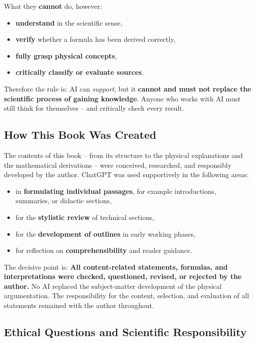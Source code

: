 What they \textbf{cannot} do, however:

\begin{itemize}
	\item \textbf{understand} in the scientific sense,
	\item \textbf{verify} whether a formula has been derived correctly,
	\item \textbf{fully grasp physical concepts},
	\item \textbf{critically classify or evaluate sources}.
\end{itemize}

Therefore the rule is:
AI can \emph{support}, but it \textbf{cannot and must not replace the scientific process of gaining knowledge}.
Anyone who works with AI must still think for themselves --
and critically check every result.

\subsection*{How This Book Was Created}

The contents of this book --
from its structure to the physical explanations
and the mathematical derivations --
were conceived, researched, and responsibly developed by the author.
ChatGPT was used supportively in the following areas:

\begin{itemize}
	\item in \textbf{formulating individual passages},
	for example introductions, summaries, or didactic sections,
	\item for the \textbf{stylistic review} of technical sections,
	\item for the \textbf{development of outlines} in early working phases,
	\item for reflection on \textbf{comprehensibility}
	and reader guidance.
\end{itemize}

The decisive point is:
\textbf{All content-related statements, formulas, and interpretations were checked, questioned, revised, or rejected by the author.}
No AI replaced the subject-matter development of the physical argumentation.
The responsibility for the content,
selection,
and evaluation of all statements remained with the author throughout.

\subsection*{Ethical Questions and Scientific Responsibility}

